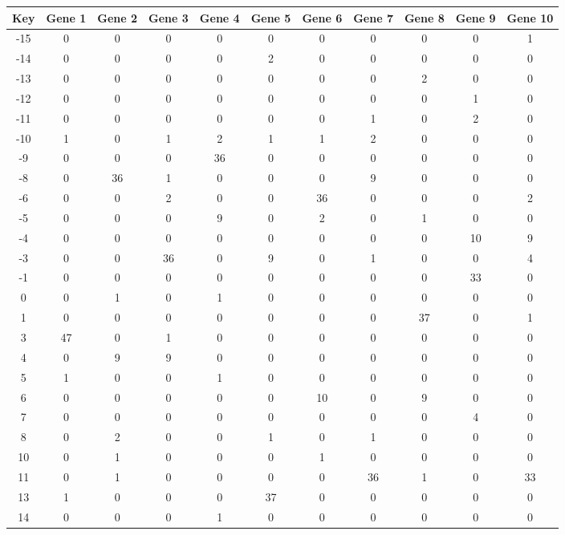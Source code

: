 \begin{tabular}{|c|c|c|c|c|c|c|c|c|c|c|}
\hline
Key & Gene 1 & Gene 2 & Gene 3 & Gene 4 & Gene 5 & Gene 6 & Gene 7 & Gene 8 & Gene 9 & Gene 10 \\
\hline
-15 & 0 & 0 & 0 & 0 & 0 & 0 & 0 & 0 & 0 & 1 \\
-14 & 0 & 0 & 0 & 0 & 2 & 0 & 0 & 0 & 0 & 0 \\
-13 & 0 & 0 & 0 & 0 & 0 & 0 & 0 & 2 & 0 & 0 \\
-12 & 0 & 0 & 0 & 0 & 0 & 0 & 0 & 0 & 1 & 0 \\
-11 & 0 & 0 & 0 & 0 & 0 & 0 & 1 & 0 & 2 & 0 \\
-10 & 1 & 0 & 1 & 2 & 1 & 1 & 2 & 0 & 0 & 0 \\
-9 & 0 & 0 & 0 & 36 & 0 & 0 & 0 & 0 & 0 & 0 \\
-8 & 0 & 36 & 1 & 0 & 0 & 0 & 9 & 0 & 0 & 0 \\
-6 & 0 & 0 & 2 & 0 & 0 & 36 & 0 & 0 & 0 & 2 \\
-5 & 0 & 0 & 0 & 9 & 0 & 2 & 0 & 1 & 0 & 0 \\
-4 & 0 & 0 & 0 & 0 & 0 & 0 & 0 & 0 & 10 & 9 \\
-3 & 0 & 0 & 36 & 0 & 9 & 0 & 1 & 0 & 0 & 4 \\
-1 & 0 & 0 & 0 & 0 & 0 & 0 & 0 & 0 & 33 & 0 \\
0 & 0 & 1 & 0 & 1 & 0 & 0 & 0 & 0 & 0 & 0 \\
1 & 0 & 0 & 0 & 0 & 0 & 0 & 0 & 37 & 0 & 1 \\
3 & 47 & 0 & 1 & 0 & 0 & 0 & 0 & 0 & 0 & 0 \\
4 & 0 & 9 & 9 & 0 & 0 & 0 & 0 & 0 & 0 & 0 \\
5 & 1 & 0 & 0 & 1 & 0 & 0 & 0 & 0 & 0 & 0 \\
6 & 0 & 0 & 0 & 0 & 0 & 10 & 0 & 9 & 0 & 0 \\
7 & 0 & 0 & 0 & 0 & 0 & 0 & 0 & 0 & 4 & 0 \\
8 & 0 & 2 & 0 & 0 & 1 & 0 & 1 & 0 & 0 & 0 \\
10 & 0 & 1 & 0 & 0 & 0 & 1 & 0 & 0 & 0 & 0 \\
11 & 0 & 1 & 0 & 0 & 0 & 0 & 36 & 1 & 0 & 33 \\
13 & 1 & 0 & 0 & 0 & 37 & 0 & 0 & 0 & 0 & 0 \\
14 & 0 & 0 & 0 & 1 & 0 & 0 & 0 & 0 & 0 & 0 \\
\hline
\end{tabular}